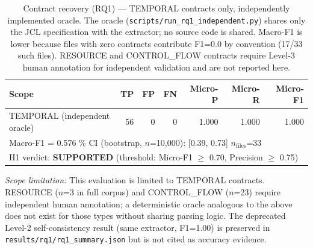 \begin{table}[t]
\small
\centering
\caption{Contract recovery (RQ1) --- TEMPORAL contracts only, independently implemented oracle. The oracle (\texttt{scripts/run\_rq1\_independent.py}) shares only the JCL specification with the extractor; no source code is shared. Macro-F1 is lower because files with zero contracts contribute F1=0.0 by convention (17/33 such files). RESOURCE and CONTROL\_FLOW contracts require Level-3 human annotation for independent validation and are not reported here.}
\label{table:rq1}
\begin{tabular}{lrrrrrr}
\toprule
Scope & TP & FP & FN & Micro-P & Micro-R & Micro-F1 \\
\midrule
TEMPORAL (independent oracle) & 56 & 0 & 0 & 1.000 & 1.000 & 1.000 \\
\midrule
\multicolumn{7}{l}{\small Macro-F1 = 0.576 \quad 95\% CI (bootstrap, $n$=10{,}000): [0.39, 0.73] \quad $n_{\mathrm{files}}$=33} \\
\multicolumn{7}{l}{\small H1 verdict: \textbf{SUPPORTED} (threshold: Micro-F1 $\geq$ 0.70, Precision $\geq$ 0.75)} \\
\bottomrule
\end{tabular}
\vspace{0.3em}
{\small \textit{Scope limitation:} This evaluation is limited to TEMPORAL contracts. RESOURCE ($n$=3 in full corpus) and CONTROL\_FLOW ($n$=23) require independent human annotation; a deterministic oracle analogous to the above does not exist for those types without sharing parsing logic. The deprecated Level-2 self-consistency result (same extractor, F1=1.00) is preserved in \texttt{results/rq1/rq1\_summary.json} but is not cited as accuracy evidence.}
\end{table}
